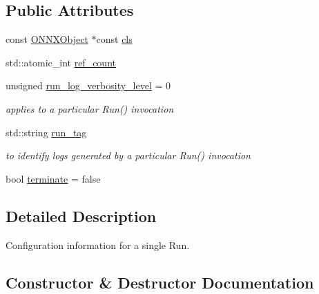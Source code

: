 \subsection*{Public Attributes}
\begin{DoxyCompactItemize}
\item 
const \mbox{\hyperlink{structONNXObject}{O\+N\+N\+X\+Object}} $\ast$const \mbox{\hyperlink{structONNXRuntimeRunOptions_a2906cd068fa80f795a9290588ff27efc}{cls}}
\item 
std\+::atomic\+\_\+int \mbox{\hyperlink{structONNXRuntimeRunOptions_a762d48d1bb2b7840b836489957d1e823}{ref\+\_\+count}}
\item 
unsigned \mbox{\hyperlink{structONNXRuntimeRunOptions_a386538b6ddbc2bf4496765ad846f53ee}{run\+\_\+log\+\_\+verbosity\+\_\+level}} = 0
\begin{DoxyCompactList}\small\item\em applies to a particular Run() invocation \end{DoxyCompactList}\item 
std\+::string \mbox{\hyperlink{structONNXRuntimeRunOptions_a99098c7d810216a1b1dab088cdf548e5}{run\+\_\+tag}}
\begin{DoxyCompactList}\small\item\em to identify logs generated by a particular Run() invocation \end{DoxyCompactList}\item 
bool \mbox{\hyperlink{structONNXRuntimeRunOptions_a62e0e505a23e7e87976953ddeb056fb3}{terminate}} = false
\end{DoxyCompactItemize}


\subsection{Detailed Description}
Configuration information for a single Run. 

\subsection{Constructor \& Destructor Documentation}
\mbox{\label{structONNXRuntimeRunOptions_a58d2e67e2a2bdc71030e77c26fbc60c9}} 

